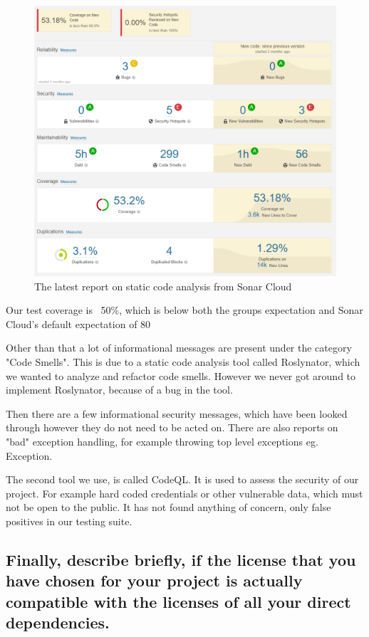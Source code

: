 \begin{figure}[h!]
    \centering
    \includegraphics[scale=0.5]{images/sonar_latest_report.PNG}
    \caption{The latest report on static code analysis from Sonar Cloud }
\end{figure}

Our test coverage is ~50\%, which is below both the groups expectation and Sonar Cloud's default expectation of 80%

Other than that a lot of informational messages are present under the category "Code Smells". 
This is due to a static code analysis tool called Roslynator, which we wanted to analyze and refactor code smells. However we never got around to implement Roslynator, because of a bug in the tool.

Then there are a few informational security messages, which have been looked through however they do not need to be acted on. There are also reports on "bad" exception handling, for example throwing top level exceptions eg. Exception. 

The second tool we use, is called CodeQL. It is used to assess the security of our project. For example hard coded credentials or other vulnerable data, which must not be open to the public. It has not found anything of concern, only false positives in our testing suite.


\subsection{Finally, describe briefly, if the license that you have chosen for your project is actually compatible with the licenses of all your direct dependencies.}
